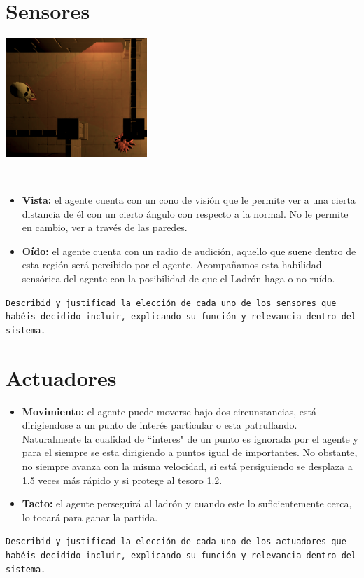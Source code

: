 \documentclass{article}
\begin{document}
\section*{\large Sensores}
\begin{center}{ \includegraphics[width=0.4\textwidth]{vision.png}}\end{center}\\
\begin{itemize}
	\item \textbf{Vista:} el agente cuenta con un cono de visión que le permite ver a una cierta distancia de él con un cierto ángulo con respecto a la normal. No le permite en cambio, ver a través de las paredes.
	\item \textbf{Oído:} el agente cuenta con un radio de audición, aquello que suene dentro de esta región será percibido por el agente. Acompañamos esta habilidad sensórica del agente con la posibilidad de que el Ladrón haga o no ruído.
\end{itemize}

\texttt{Describid y justificad la elección de cada uno de los sensores que habéis decidido incluir, explicando su función y relevancia dentro del sistema.}
\section*{\large Actuadores}
\begin{itemize}
	\item \textbf{Movimiento:} el agente puede moverse bajo dos circunstancias, está dirigiendose a un punto de interés particular o esta patrullando. Naturalmente la cualidad de ``interes" de un punto es ignorada por el agente y para el siempre se esta dirigiendo a puntos igual de importantes. No obstante, no siempre avanza con la misma velocidad, si está persiguiendo se desplaza a  1.5 veces más rápido y si protege al tesoro 1.2.
	\item \textbf{Tacto:} el agente perseguirá al ladrón y cuando este lo suficientemente cerca, lo tocará para ganar la partida.
\end{itemize}
\texttt{Describid y justificad la elección de cada uno de los actuadores que habéis decidido incluir, explicando su función y relevancia dentro del sistema.}
\end{document}
